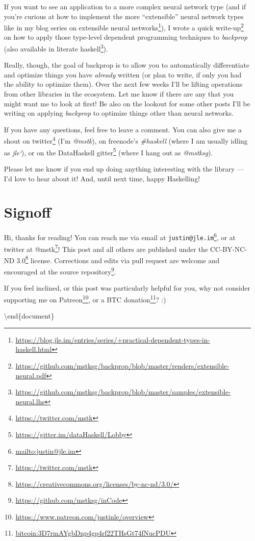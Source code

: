 \documentclass[]{article}
\renewcommand{\href}[2]{#2\footnote{\url{#1}}}
\begin{document}
If you want to see an application to a more complex neural network type (and if
you're curious at how to implement the more ``extensible'' neural network types
like in my
\href{https://blog.jle.im/entries/series/+practical-dependent-types-in-haskell.html}{blog
series on extensible neural networks}), I wrote
\href{https://github.com/mstksg/backprop/blob/master/renders/extensible-neural.pdf}{a
quick write-up} on how to apply those type-level dependent programming
techniques to \emph{backprop} (also available in
\href{https://github.com/mstksg/backprop/blob/master/samples/extensible-neural.lhs}{literate
haskell}).

Really, though, the goal of backprop is to allow you to automatically
differentiate and optimize things you have \emph{already} written (or plan to
write, if only you had the ability to optimize them). Over the next few weeks
I'll be lifting operations from other libraries in the ecosystem. Let me know if
there are any that you might want me to look at first! Be also on the lookout
for some other posts I'll be writing on applying \emph{backprop} to optimize
things other than neural networks.

If you have any questions, feel free to leave a comment. You can also give me a
shout on \href{https://twitter.com/mstk}{twitter} (I'm \emph{@mstk}), on
freenode's \emph{\#haskell} (where I am usually idling as \emph{jle`}), or on
the \href{https://gitter.im/dataHaskell/Lobby}{DataHaskell gitter} (where I hang
out as \emph{@mstksg}).

Please let me know if you end up doing anything interesting with the library ---
I'd love to hear about it! And, until next time, happy Haskelling!

\section{Signoff}\label{signoff}

Hi, thanks for reading! You can reach me via email at
\href{mailto:justin@jle.im}{\nolinkurl{justin@jle.im}}, or at twitter at
\href{https://twitter.com/mstk}{@mstk}! This post and all others are published
under the \href{https://creativecommons.org/licenses/by-nc-nd/3.0/}{CC-BY-NC-ND
3.0} license. Corrections and edits via pull request are welcome and encouraged
at \href{https://github.com/mstksg/inCode}{the source repository}.

If you feel inclined, or this post was particularly helpful for you, why not
consider \href{https://www.patreon.com/justinle/overview}{supporting me on
Patreon}, or a \href{bitcoin:3D7rmAYgbDnp4gp4rf22THsGt74fNucPDU}{BTC donation}?
:)

\textbackslash end\{document\}
\end{document}
